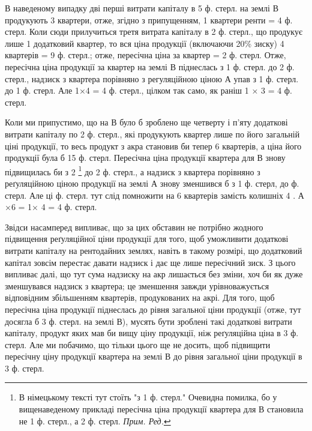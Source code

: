 В наведеному випадку дві перші витрати капіталу в 5 ф. стерл. на землі В
продукують 3  квартери, отже, згідно з припущенням, 1   квартери ренти =
4   ф. стерл. Коли сюди прилучиться третя витрата капіталу в
2  ф. стерл.,
що продукує лише 1 додатковий квартер, то вся ціна продукції (включаючи 20\%
зиску) 4   квартерів = 9 ф. стерл.; отже, пересічна ціна за квартер = 2 ф. стерл.
Отже, пересічна ціна продукції за квартер на землі В піднеслась з 1  ф. стерл.
до 2 ф. стерл., надзиск з квартера порівняно з регуляційною ціною А упав
з 1   ф. стерл. до 1 ф. стерл. Але 1×4   = 4   ф. стерл., цілком так само,
як раніш 1   × 3  = 4  ф. стерл.

Коли ми припустимо, що на В було б зроблено ще четверту і п’яту додаткові
витрати капіталу по 2   ф. стерл., які продукують квартер лише по його
загальній ціні продукції, то весь продукт з акра становив би тепер 6   квартерів,
а ціна його продукції була б 15 ф. стерл. Пересічна ціна продукції
квартера для В знову підвищилась би з 2
\footnote*{В німецькому тексті тут стоїть "з 1 ф. стерл." Очевидна помилка,
бо у вищенаведеному прикладі пересічна ціна продукції квартера для В
становила не 1 ф. стерл., а 2 ф. стерл. \emph{Прим. Ред.}}
до 2   ф. стерл., а надзиск з квартера
порівняно з реґуляційною ціною продукції на землі А знову зменшився
б з 1 ф. стерл, до  ф. стерл. Але ці  ф. стерл. тут слід
помножити на 6  квартерів замість колишніх 4 .
А ×6  = 1× 4  = 4  ф. стерл.

Звідси насамперед випливає, що за цих обставин не потрібно жодного підвищення
реґуляційної ціни продукції для того, щоб уможливити додаткові витрати
капіталу на рентодайних землях, навіть в такому розмірі, що додатковий
капітал зовсім перестає давати надзиск і дає ще лише пересічний зиск. З
цього випливає далі, що тут сума надзиску на акр лишається без зміни,
хоч би як дуже зменшувався надзиск з квартера; це зменшення завжди урівноважується
відповідним збільшенням квартерів, продукованих на акрі. Для того,
щоб пересічна ціна продукції піднеслась до рівня загальної ціни продукції (отже,
тут досягла б 3 ф. стерл. на землі В), мусять бути зроблені такі додаткові витрати
капіталу, продукт яких мав би вищу ціну продукції, ніж реґуляційна ціна
в 3 ф. стерл. Але ми побачимо, що тільки цього ще не досить, щоб підвищити
пересічну ціну продукції квартера на землі В до рівня загальної ціни продукції
в 3 ф. стерл.

